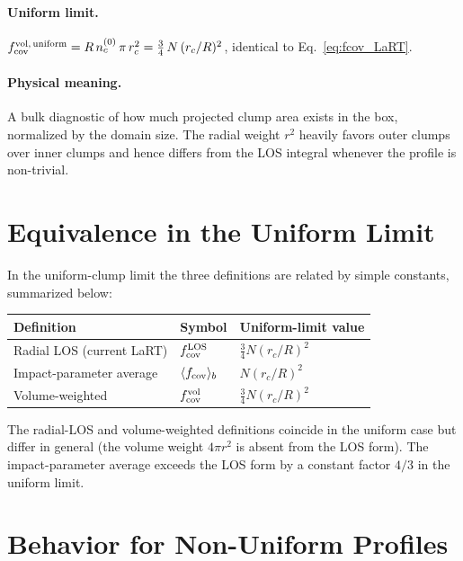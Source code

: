 \documentclass[english,a4paper]{my_memo}
\begin{document}
\paragraph{Uniform limit.}
$f_{\rm cov}^{\rm vol,\,uniform} = R\,n_c^{(0)}\,\pi\,r_c^{2} =
\tfrac{3}{4}\,N\,(r_c/R)^{2}$, identical to Eq.~\eqref{eq:fcov_LaRT}.

\paragraph{Physical meaning.} A bulk diagnostic of how much projected
clump area exists in the box, normalized by the domain size.  The radial
weight $r^{2}$ heavily favors outer clumps over inner clumps and hence
differs from the LOS integral whenever the profile is non-trivial.

\section{Equivalence in the Uniform Limit}

In the uniform-clump limit the three definitions are related by simple
constants, summarized below:

\begin{center}
\renewcommand{\arraystretch}{1.4}
\begin{tabular}{@{}lll@{}}
\hline
Definition & Symbol & Uniform-limit value \\
\hline
Radial LOS (current LaRT)        & $f_{\rm cov}^{\rm LOS}$            & $\tfrac{3}{4}N(r_c/R)^{2}$ \\
Impact-parameter average         & $\langle f_{\rm cov}\rangle_{b}$   & $N(r_c/R)^{2}$ \\
Volume-weighted                  & $f_{\rm cov}^{\rm vol}$            & $\tfrac{3}{4}N(r_c/R)^{2}$ \\
\hline
\end{tabular}
\end{center}

The radial-LOS and volume-weighted definitions coincide in the uniform
case but differ in general (the volume weight $4\pi r^{2}$ is absent from
the LOS form).  The impact-parameter average exceeds the LOS form by a
constant factor $4/3$ in the uniform limit.

\section{Behavior for Non-Uniform Profiles}
\end{document}
